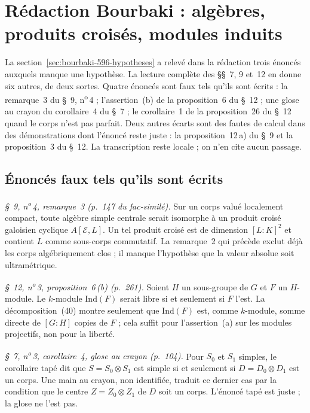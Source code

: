 \section[Rédaction Bourbaki \redac{596} : algèbres, produits croisés, modules induits]{Rédaction Bourbaki  : algèbres, produits croisés, modules induits\protect{}}\label{sec:bourbaki-596-algebres}

La section~\ref{sec:bourbaki-596-hypotheses} a relevé dans la rédaction  trois énoncés auxquels manque une hypothèse. La lecture complète des §§~7, 9 et~12 en donne six autres, de deux sortes. Quatre énoncés sont faux tels qu'ils sont écrits : la remarque~3 du §~9, n\textsuperscript{o}\,4 ; l'assertion~(b) de la proposition~6 du §~12 ; une glose au crayon du corollaire~4 du §~7 ; le corollaire~1 de la proposition~26 du §~12 quand le corps n'est pas parfait. Deux autres écarts sont des fautes de calcul dans des démonstrations dont l'énoncé reste juste : la proposition~12\,a) du §~9 et la proposition~3 du §~12. La transcription reste locale ; on n'en cite aucun passage.

\subsection*{Énoncés faux tels qu'ils sont écrits}

\emph{§~9, n\textsuperscript{o}\,4, remarque~3 (p.~147 du fac-similé).} Sur un corps valué localement compact, toute algèbre simple centrale serait isomorphe à un produit croisé galoisien cyclique $A[\mathcal E, L]$. Un tel produit croisé est de dimension $[L:K]^2$ et contient $L$ comme sous-corps commutatif. La remarque~2 qui précède exclut déjà les corps algébriquement clos ; il manque l'hypothèse que la valeur absolue soit ultramétrique.

\emph{§~12, n\textsuperscript{o}\,3, proposition~6\,(b) (p.~261).} Soient $H$ un sous-groupe de $G$ et $F$ un $H$-module. Le $k$-module $\mathrm{Ind}(F)$ serait libre si et seulement si $F$ l'est. La décomposition~(40) montre seulement que $\mathrm{Ind}(F)$ est, comme $k$-module, somme directe de $[G:H]$ copies de $F$ ; cela suffit pour l'assertion~(a) sur les modules projectifs, non pour la liberté.

\emph{§~7, n\textsuperscript{o}\,3, corollaire~4, glose au crayon (p.~104).} Pour $S_0$ et $S_1$ simples, le corollaire tapé dit que $S = S_0 \otimes S_1$ est simple si et seulement si $D = D_0 \otimes D_1$ est un corps. Une main au crayon, non identifiée, traduit ce dernier cas par la condition que le centre $Z = Z_0 \otimes Z_1$ de $D$ soit un corps. L'énoncé tapé est juste ; la glose ne l'est pas.

